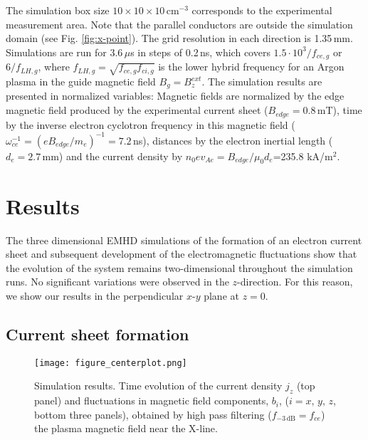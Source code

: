 \documentclass[aip,preprint]{revtex4-1}
\begin{document}

The simulation box size $10\times 10\times 10\,$cm$^{-3}$ corresponds to the experimental measurement area. Note that the parallel conductors are outside the simulation domain (see Fig. \ref{fig:x-point}). The grid resolution in each direction is 1.35\,mm.  Simulations are run for $3.6\,\mu$s in steps of 0.2\,ns, which covers $1.5\cdot 10^3/f_{ce,g}$ or $6/f_{LH,g}$, where $f_{LH,g}=\sqrt{f_{ce,g}f_{ci,g}}$ is the lower hybrid frequency for an Argon plasma in the guide magnetic field $B_g=B_z^{ext}$.
The simulation results are presented in normalized variables: Magnetic fields are normalized by the edge magnetic field produced by the experimental current sheet ($B_{edge}=0.8\,$mT), time by the inverse electron cyclotron frequency in this magnetic field ($\omega_{ce}^{-1}=(eB_{edge}/m_e)^{-1}=7.2\,$ns), distances by the electron inertial length ($d_e=2.7\,$mm) and the current density by $n_0ev_{Ae}=B_{edge}/\mu_0d_e$=235.8 kA/m$^2$.

\section{Results\label{sec:results}}
The three dimensional EMHD simulations of the formation of an electron current sheet and subsequent development of the electromagnetic fluctuations show that the evolution of the system remains two-dimensional throughout the simulation runs. No significant variations were observed in the $z$-direction. For this reason, we show our results in the perpendicular $x$-$y$ plane at  $z=0$. 
\subsection{Current sheet formation\label{sec:ecs}}

\begin{figure}
\texttt{[image: figure\_centerplot.png]}
\caption{Simulation results. Time evolution of the current density $j_z$ (top panel) and fluctuations in magnetic field components,  $b_i$, ($i=x, \, y, \, z$, bottom three panels), obtained by  high pass filtering ($f_{-3\,\mathrm{dB}}=f_{ce}$)  the plasma magnetic field near the X-line. }
\label{fig:jz_time}
\end{figure}
\end{document}
